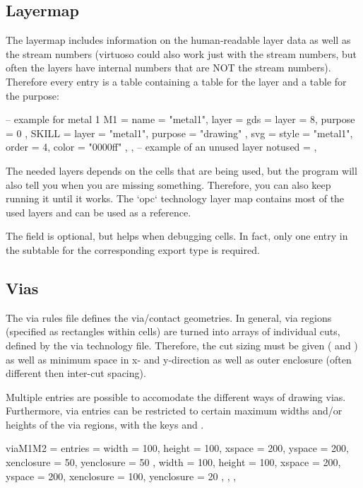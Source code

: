 \subsection{Layermap}
The layermap includes information on the human-readable layer data as well as the stream numbers (virtuoso could also work just with the stream
numbers, but often the layers have internal numbers that are NOT the stream numbers).
Therefore every entry is a table containing a table for the layer and a table for the purpose:

\begin{lualisting}
    -- example for metal 1
    M1 = {
        name = "metal1",
        layer = {
            gds = { layer = 8, purpose = 0 },
            SKILL = { layer = "metal1", purpose = "drawing" },
            svg = { style = "metal1", order = 4, color = "0000ff" },
        }
    },
    -- example of an unused layer
    notused = {},
\end{lualisting}

The needed layers depends on the cells that are being used, but the program will also tell you when you are missing something.
Therefore, you can also keep running it until it works.
The `opc` technology layer map contains most of the used layers and can be used as a reference.

The  field is optional, but helps when debugging cells.
In fact, only one entry in the  subtable for the corresponding export type is required.

\subsection{Vias}
The via rules file defines the via/contact geometries.
In general, via regions (specified as rectangles within cells) are turned into arrays of individual cuts, defined by the via technology file.
Therefore, the cut sizing must be given ( and ) as well as minimum space in x- and y-direction as well as outer enclosure (often different then inter-cut spacing).

Multiple entries are possible to accomodate the different ways of drawing vias.
Furthermore, via entries can be restricted to certain maximum widths and/or heights of the via regions, with the keys  and .

\begin{lualisting}
    viaM1M2 = {
        entries = {
            {
                width = 100, height = 100,
                xspace = 200, yspace = 200,
                xenclosure = 50, yenclosure = 50
            },
            {
                width = 100, height = 100,
                xspace = 200, yspace = 200,
                xenclosure = 100, yenclosure = 20
            },
        },
    },
\end{lualisting}

